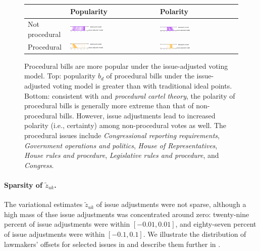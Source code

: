 \begin{figure}
  \begin{tabular}{|m{0.85in}|m{2.54in}|m{2.54in}|}
    \hline
    & Popularity & Polarity \\
    \hline
    Not procedural &
    \includegraphics[width=0.4\textwidth]{chapter_spatial_voting_with_text/figures/3398_noprocedural_popularity.pdf} &
    \includegraphics[width=0.4\textwidth]{chapter_spatial_voting_with_text/figures/3398_noprocedural_polarity.pdf} \\
    Procedural &
    \includegraphics[width=0.4\textwidth]{chapter_spatial_voting_with_text/figures/3398_procedural_popularity.pdf} &
    \includegraphics[width=0.4\textwidth]{chapter_spatial_voting_with_text/figures/3398_procedural_polarity.pdf} \\
    \hline
  \end{tabular}
  \caption{Procedural bills are more popular under the issue-adjusted
    voting model. Top: popularity $b_d$ of procedural bills under the
    issue-adjusted voting model is greater than with traditional ideal
    points.  Bottom: consistent with \citet{cox:2002} and
    \emph{procedural cartel theory}, the polarity of procedural bills
    is generally more extreme than that of non-procedural bills.
    However, issue adjustments lead to increased polarity (i.e.,
    certainty) among non-procedural votes as well.  The procedural
    issues include \emph{Congressional reporting requirements},
    \emph{Government operations and politics}, \emph{House of
      Representatives}, \emph{House rules and procedure},
    \emph{Legislative rules and procedure}, and \emph{Congress}.}
  \label{figure:bills_parameter_changes}
\end{figure}

\paragraph{Sparsity of $\tilde z_{uk}$.}
The variational estimates $\tilde z_{uk}$ of issue adjustments were
not sparse, although a high mass of thse issue adjustments was
concentrated around zero: twenty-nine percent of issue adjustments
were within $[-0.01, 0.01]$, and eighty-seven percent of issue
adjustments were within $[-0.1, 0.1]$.  We illustrate the distribution
of lawmakers' offsets for selected issues in
 and describe them further in
.

